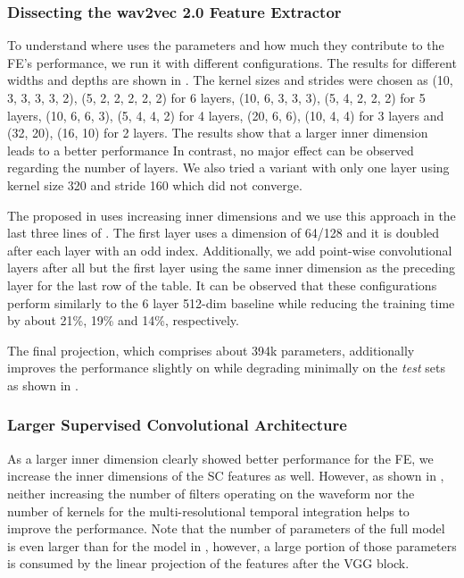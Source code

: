 \documentclass{INTERSPEECH2023}
\begin{document}
\subsubsection{Dissecting the wav2vec 2.0 Feature Extractor}
\label{sec:w2v_components}
To understand where \wvtwo uses the parameters and how much they contribute to the \gls{FE}'s performance, we run it with different configurations.
The results for different widths and depths are shown in .
The kernel sizes and strides were chosen as (10, 3, 3, 3, 3, 2), (5, 2, 2, 2, 2, 2) for 6 layers, (10, 6, 3, 3, 3), (5, 4, 2, 2, 2) for 5 layers, (10, 6, 6, 3), (5, 4, 4, 2) for 4 layers, (20, 6, 6), (10, 4, 4) for 3 layers and (32, 20), (16, 10) for 2 layers.
The results show that a larger inner dimension leads to a better performance
In contrast, no major effect can be observed regarding the number of layers.
We also tried a variant with only one layer using kernel size 320 and stride 160 which did not converge.

The proposed \fe in \cite{asapp2022performance} uses increasing inner dimensions and we use this approach in the last three lines of .
The first layer uses a dimension of 64/128 and it is doubled after each layer with an odd index.
Additionally, we add point-wise convolutional layers after all but the first layer using the same inner dimension as the preceding layer for the last row of the table.
It can be observed that these configurations perform similarly to the 6 layer 512-dim baseline while reducing the training time by about 21\%, 19\% and 14\%, respectively.

The final projection, which comprises about 394k parameters, additionally improves the performance slightly on \devother while degrading minimally on the \textit{test} sets as shown in .




\subsubsection{Larger Supervised Convolutional Architecture}
\label{sec:scf_size}
As a larger inner dimension clearly showed better performance for the \wvtwo \gls{FE}, we increase the inner dimensions of the \gls{SC} features as well.
However, as shown in , neither increasing the number of filters operating on the waveform nor the number of kernels for the multi-resolutional temporal integration helps to improve the performance.
Note that the number of parameters of the full model is even larger than for the \wvtwo model in , however, a large portion of those parameters is consumed by the linear projection of the features after the \gls{VGG} block.

\end{document}
